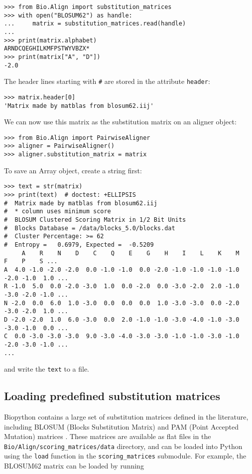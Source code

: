 \begin{verbatim}
>>> from Bio.Align import substitution_matrices
>>> with open("BLOSUM62") as handle:
...     matrix = substitution_matrices.read(handle)
...
>>> print(matrix.alphabet)
ARNDCQEGHILKMFPSTWYVBZX*
>>> print(matrix["A", "D"])
-2.0
\end{verbatim}
The header lines starting with \verb+#+ are stored in the attribute \verb+header+:

\begin{verbatim}
>>> matrix.header[0]
'Matrix made by matblas from blosum62.iij'
\end{verbatim}
We can now use this matrix as the substitution matrix on an aligner object:

\begin{verbatim}
>>> from Bio.Align import PairwiseAligner
>>> aligner = PairwiseAligner()
>>> aligner.substitution_matrix = matrix
\end{verbatim}
To save an Array object, create a string first:

\begin{verbatim}
>>> text = str(matrix)
>>> print(text)  # doctest: +ELLIPSIS
#  Matrix made by matblas from blosum62.iij
#  * column uses minimum score
#  BLOSUM Clustered Scoring Matrix in 1/2 Bit Units
#  Blocks Database = /data/blocks_5.0/blocks.dat
#  Cluster Percentage: >= 62
#  Entropy =   0.6979, Expected =  -0.5209
     A    R    N    D    C    Q    E    G    H    I    L    K    M    F    P    S ...
A  4.0 -1.0 -2.0 -2.0  0.0 -1.0 -1.0  0.0 -2.0 -1.0 -1.0 -1.0 -1.0 -2.0 -1.0  1.0 ...
R -1.0  5.0  0.0 -2.0 -3.0  1.0  0.0 -2.0  0.0 -3.0 -2.0  2.0 -1.0 -3.0 -2.0 -1.0 ...
N -2.0  0.0  6.0  1.0 -3.0  0.0  0.0  0.0  1.0 -3.0 -3.0  0.0 -2.0 -3.0 -2.0  1.0 ...
D -2.0 -2.0  1.0  6.0 -3.0  0.0  2.0 -1.0 -1.0 -3.0 -4.0 -1.0 -3.0 -3.0 -1.0  0.0 ...
C  0.0 -3.0 -3.0 -3.0  9.0 -3.0 -4.0 -3.0 -3.0 -1.0 -1.0 -3.0 -1.0 -2.0 -3.0 -1.0 ...
...
\end{verbatim}
and write the \verb+text+ to a file.

\subsection{Loading predefined substitution matrices}

Biopython contains a large set of substitution matrices defined in the literature, including BLOSUM (Blocks Substitution Matrix) \cite{henikoff1992} and PAM (Point Accepted Mutation) matrices \cite{dayhoff1978}. These matrices are available as flat files in the \verb+Bio/Align/scoring_matrices/data+ directory, and can be loaded into Python using the \verb+load+ function in the \verb+scoring_matrices+ submodule. For example, the BLOSUM62 matrix can be loaded by running

